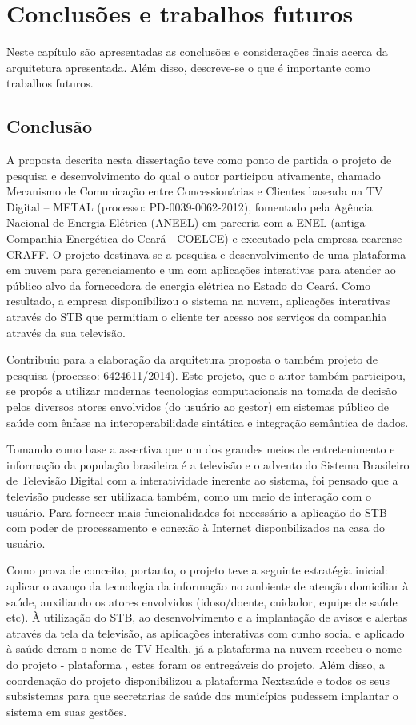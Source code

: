 \chapter{Conclusões e trabalhos futuros} \label{cap:conclusao}

Neste capítulo são apresentadas as conclusões e considerações finais acerca da
arquitetura apresentada. Além disso, descreve-se o que é importante
como trabalhos futuros.

\section{Conclusão} \label{sec:conclusao}

A proposta descrita nesta dissertação teve como ponto de partida o projeto de
pesquisa e desenvolvimento do qual o autor participou ativamente, chamado
Mecanismo de Comunicação entre Concessionárias e Clientes baseada na TV Digital
– METAL (processo: PD-0039-0062-2012), fomentado pela Agência Nacional de
Energia Elétrica (ANEEL) em parceria com a ENEL (antiga Companhia Energética do
Ceará - COELCE) e executado pela empresa cearense CRAFF. O projeto destinava-se
a pesquisa e desenvolvimento de uma plataforma em nuvem para gerenciamento e um
\stb[] com aplicações interativas para atender ao público alvo da fornecedora de
energia elétrica no Estado do Ceará. Como resultado, a empresa disponibilizou o
sistema na nuvem, aplicações interativas através do STB que permitiam o cliente
ter acesso aos serviços da companhia através da sua televisão.

Contribuiu para a elaboração da arquitetura proposta o também projeto de
pesquisa \nextsaude[] (processo: 6424611/2014). Este projeto, que o autor também
participou, se propôs a utilizar modernas tecnologias computacionais na tomada
de decisão pelos diversos atores envolvidos (do usuário ao gestor) em sistemas
público de saúde com ênfase na interoperabilidade sintática e integração 
semântica de dados.

Tomando como base a assertiva que um dos grandes meios de entretenimento e
informação da população brasileira é a televisão e o advento do Sistema
Brasileiro de Televisão Digital com a interatividade inerente ao sistema, foi
pensado que a televisão pudesse ser utilizada também, como um meio de interação
com o usuário. Para fornecer mais funcionalidades foi necessário a aplicação do
STB com poder de processamento e conexão à Internet disponbilizados na casa do
usuário.   

Como prova de conceito, portanto, o projeto teve a seguinte estratégia inicial:
aplicar o avanço da tecnologia da informação no ambiente de atenção domiciliar
à saúde, auxiliando os atores envolvidos (idoso/doente, cuidador, equipe de
saúde etc). À utilização do STB, ao desenvolvimento e a implantação de avisos e
alertas através da tela da televisão, as aplicações interativas com cunho
social e aplicado à saúde deram o nome de TV-Health, já a plataforma na nuvem
recebeu o nome do projeto - plataforma \nextsaude, estes foram os entregáveis do
projeto. Além disso, a coordenação do projeto disponibilizou a plataforma
Nextsaúde e todos os seus subsistemas para que secretarias de saúde dos
municípios pudessem implantar o sistema em suas gestões.

